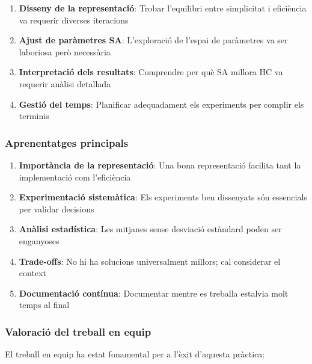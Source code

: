 \begin{enumerate}
    \item \textbf{Disseny de la representació}: Trobar l'equilibri entre simplicitat i eficiència va requerir diverses iteracions
    
    \item \textbf{Ajust de paràmetres SA}: L'exploració de l'espai de paràmetres va ser laboriosa però necessària
    
    \item \textbf{Interpretació dels resultats}: Comprendre per què SA millora HC va requerir anàlisi detallada
    
    \item \textbf{Gestió del temps}: Planificar adequadament els experiments per complir els terminis
\end{enumerate}

\subsubsection{Aprenentatges principals}

\begin{enumerate}
    \item \textbf{Importància de la representació}: Una bona representació facilita tant la implementació com l'eficiència
    
    \item \textbf{Experimentació sistemàtica}: Els experiments ben dissenyats són essencials per validar decisions
    
    \item \textbf{Anàlisi estadística}: Les mitjanes sense desviació estàndard poden ser enganyoses
    
    \item \textbf{Trade-offs}: No hi ha solucions universalment millors; cal considerar el context
    
    \item \textbf{Documentació contínua}: Documentar mentre es treballa estalvia molt temps al final
\end{enumerate}

\subsubsection{Valoració del treball en equip}

El treball en equip ha estat fonamental per a l'èxit d'aquesta pràctica:

